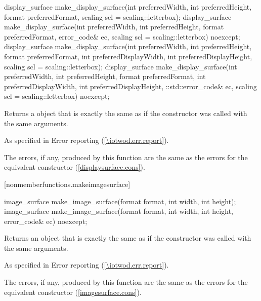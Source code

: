 \begin{itemdecl}
display_surface make_display_surface(int preferredWidth,
  int preferredHeight, format preferredFormat,
  scaling scl = scaling::letterbox);
display_surface make_display_surface(int preferredWidth,
  int preferredHeight, format preferredFormat, error_code& ec,
  scaling scl = scaling::letterbox) noexcept;
display_surface make_display_surface(int preferredWidth,
  int preferredHeight, format preferredFormat, int preferredDisplayWidth, 
  int preferredDisplayHeight, scaling scl = scaling::letterbox);
display_surface make_display_surface(int preferredWidth,
  int preferredHeight, format preferredFormat, int preferredDisplayWidth, 
  int preferredDisplayHeight, ::std::error_code& ec,
  scaling scl = scaling::letterbox) noexcept;
\end{itemdecl}
\begin{itemdescr}
\pnum
\returns
Returns a  object that is exactly the same as if the  constructor was called with the same arguments.

\pnum
\throws
As specified in Error reporting (\ref{\iotwod.err.report}).

\pnum
\errors
The errors, if any, produced by this function are the same as the errors for the equivalent  constructor (\ref{displaysurface.cons}).
\end{itemdescr}

 [nonmemberfunctions.makeimagesurface] {}

\indexlibrary{\idxcode{}}
\begin{itemdecl}
image_surface make_image_surface(format format, int width, int height);
image_surface make_image_surface(format format, int width, int height, 
  error_code& ec) noexcept;
\end{itemdecl}
\begin{itemdescr}
\pnum
\returns
Returns an  object that is exactly the same as if the  constructor was called with the same arguments.

\pnum
\throws
As specified in Error reporting (\ref{\iotwod.err.report}).

\pnum
\errors
The errors, if any, produced by this function are the same as the errors for the equivalent  constructor (\ref{imagesurface.cons}).
\end{itemdescr}
